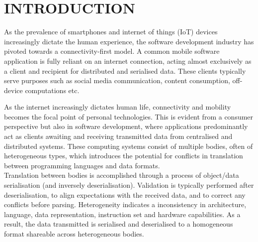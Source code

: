 \documentclass[../report.tex]{subfiles}
\begin{document}
\section{INTRODUCTION}

As the prevalence of smartphones and internet of things (IoT) devices increasingly dictate the human experience, the software development industry has pivoted towards a connectivity-first model. A common mobile software application is fully reliant on an internet connection, acting almost exclusively as a client and recipient for distributed and serialised data. These clients typically serve purposes such as social media communication, content consumption, off-device computations etc. 









As the internet increasingly dictates human life, connectivity and mobility becomes the focal point of personal technologies. This is evident from a consumer perspective but also in software development, where applications predominantly act as clients awaiting and receiving transmitted data from centralised and distributed systems. These computing systems consist of multiple bodies, often of heterogeneous types, which introduces the potential for conflicts in translation between programming languages and data formats. \\

Translation between bodies is accomplished through a process of object/data serialisation (and inversely deserialisation). Validation is typically performed after deserialisation, to align expectations with the received data, and to correct any conflicts before parsing. Heterogeneity indicates a inconsistency in architecture, language, data representation, instruction set and hardware capabilities. As a result, the data transmitted is serialised and deserialised to a homogeneous format shareable across heterogeneous bodies. \\
\end{document}
